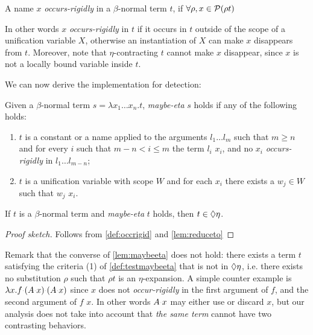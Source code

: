 \documentclass[sigconf,natbib=false,review]{acmart}
\newcommand{\appsep}{\ensuremath{\textcolor{lightgray}{\cdot}}}
\newcommand{\llambda}{\ensuremath{\mathcal{L}_\lambda}\xspace}
\begin{document}

\newcommand{\occursrigid}{\emph{occurs-rigidly}\xspace}
\newcommand{\occurrigid}{\emph{occur-rigidly}\xspace}
\begin{definition}[\occursrigid]\label{def:occrigid}
  A name $x$ \occursrigid{} in a $\beta$-normal term $t$, if $\forall \rho, x \in
  \mathcal{P}(\rho t)$
\end{definition}

In other words $x$ \occursrigid in $t$ if it occurs in $t$
outside of the scope of a unification variable $X$, otherwise an instantiation
of $X$ can make $x$ disappears from $t$.
Moreover, note that $\eta$-contracting $t$ cannot make $x$ disappear, since
$x$ is not a locally bound variable inside $t$.

We can now derive the implementation for \maybeeta detection:

\newcommand{\testmaybeeta}{\emph{maybe-eta}\xspace}
\begin{definition}[\testmaybeeta]\label{def:testmaybeeta}
  Given a $\beta$-normal term
  $s = \lambda x_1 \ldots x_n.t$, \testmaybeeta{} $s$ holds if any
  of the following holds:
  \begin{enumerate}
    \item $t$ is a constant or a name applied to the arguments
      $l_1 \ldots l_m$ such that 
      $m \geq n$ and for every $i$ such that $m - n < i \leq m$
      the term  $l_i$
      \reduceto{} $x_i$, and
      no $x_i$ \occursrigid{} in $l_1 \ldots l_{m-n}$;
    \item $t$ is a
      unification variable with scope $W$ and
      for each $x_i$ there exists a $w_j \in W$ such that $w_j$
      \reduceto{} $x_i$.
  \end{enumerate}
\end{definition}
\begin{lemma}\label{lem:maybeeta}
  If $t$ is a $\beta$-normal term and \testmaybeeta{} $t$ holds,
  then $t \in \Diamond\eta$.
\end{lemma}
\begin{proof}[Proof sketch]
Follows from \cref{def:occrigid} and \cref{lem:reduceto}
\end{proof}

\noindent
Remark that the converse of \cref{lem:maybeeta} does not hold: 
there exists a term $t$ satisfying the criteria (1) of
\cref{def:testmaybeeta} that is not in $\Diamond\eta$, i.e.
there exists no substitution $\rho$ such that $\rho t$ is an
$\eta$-expansion. A simple counter example is
$\lambda x. f \appsep (A \appsep x) \appsep (A \appsep x)$
since $x$ does not \occurrigid{} in the first argument
of $f$,
and the second argument of $f$ \reduceto{} $x$.
In other words $A \appsep x$
may either use or discard $x$, but our analysis does not
take into account that \emph{the same
term} cannot have two contrasting behaviors.
\end{document}

